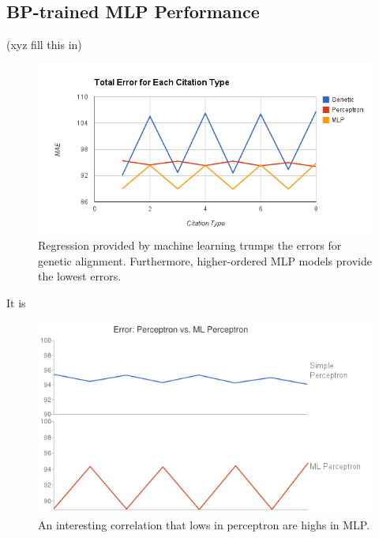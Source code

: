 
\clearpage

\subsection{BP-trained MLP Performance}
(xyz fill this in)

\begin{figure}[center]
	\centering
	\includegraphics[width=16cm]{images/total_error_all_approaches.png}
	\caption{Regression provided by machine learning trumps the errors for genetic alignment. Furthermore, higher-ordered MLP models provide the lowest errors.}
	\label{fig:overall_ml}
\end{figure}

It is 
\begin{figure}[center]
	\centering
	\includegraphics[width=12cm]{images/Perceptron_vs_ML.png}
	\caption{An interesting correlation that lows in perceptron are highs in MLP.}
	\label{fig:perceptron_vs_bp}
\end{figure}
\clearpage

